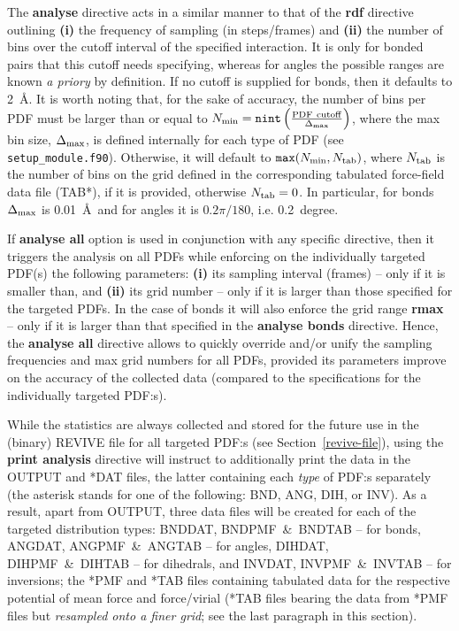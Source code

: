 The {\bf analyse} directive acts in a similar manner to that
of the {\bf rdf} directive outlining {\bf (i)} the frequency
of sampling (in steps/frames) and {\bf (ii)} the number of
bins over the cutoff interval of the specified interaction.
It is only for bonded pairs that this cutoff needs specifying,
whereas for angles the possible ranges are known {\em a priory}
by definition. If no cutoff is supplied for bonds, then it
defaults to 2~\AA.  It is worth noting that, for the sake of
accuracy, the number of bins per PDF must be larger than or equal
to $N_{\rm min} = {\tt nint} \left( \frac{\rm PDF~cutoff}{\Delta_{\rm max}} \right)$,
where the max bin size, $\Delta_{\rm max}$, is defined internally
for each type of PDF (see {\tt setup\_module.f90}).  Otherwise,
it will default to ${\tt max}(N_{\rm min},N_{\rm tab})$,
where $N_{\rm tab}$ is the number of bins on the grid defined
in the corresponding tabulated force-field data file (TAB*),
if it is provided, otherwise $N_{\rm tab}=0$.
In particular, for bonds $\Delta_{\rm max}$ is 0.01~\AA~and
for angles it is $0.2 \pi/180$, i.e. 0.2~degree.

If {\bf analyse all} option is used in conjunction with any specific
directive, then it triggers the analysis on all PDFs while enforcing
on the individually targeted PDF(s) the following parameters: {\bf (i)}
its sampling interval (frames) -- only if it is smaller than,
and {\bf (ii)} its grid number -- only if it is larger than
those specified for the targeted PDFs.
In the case of bonds it will also enforce the grid range {\bf rmax} --
only if it is larger than that specified in the {\bf analyse bonds}
directive. Hence, the {\bf analyse all} directive allows to
quickly override and/or unify the sampling frequencies and
max grid numbers for all PDFs, provided its parameters improve
on the accuracy of the collected data (compared to the specifications
for the individually targeted PDF:s).

While the statistics are always collected and stored for the
future use in the (binary) REVIVE file for all targeted PDF:s
(see Section~\ref{revive-file}), using the {\bf print analysis}
directive will instruct \D to additionally print the data in
the OUTPUT and *DAT files, the latter containing each {\it type}
of PDF:s separately (the asterisk stands for one of the following: BND,
ANG, DIH, or INV).  As a result, apart from OUTPUT, three data files
will be created for each of the targeted distribution types:
BNDDAT, BNDPMF~\&~BNDTAB -- for bonds, ANGDAT, ANGPMF~\&~ANGTAB
-- for angles, DIHDAT, DIHPMF~\&~DIHTAB -- for dihedrals, and INVDAT,
INVPMF~\&~INVTAB -- for inversions; the *PMF and *TAB files containing
tabulated data for the respective potential of mean force and
force/virial (*TAB files bearing the data from *PMF files but
{\em resampled onto a finer grid}; see the last paragraph
in this section).

